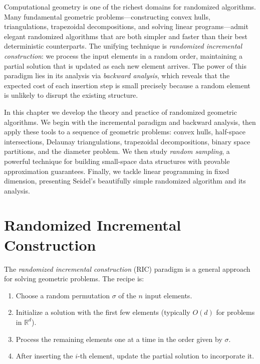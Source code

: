\documentclass[twoside,12pt]{book}
\theoremstyle{plain}
\theoremstyle{definition}
\theoremstyle{remark}
\begin{document}
Computational geometry is one of the richest domains for randomized algorithms. Many fundamental geometric problems---constructing convex hulls, triangulations, trapezoidal decompositions, and solving linear programs---admit elegant randomized algorithms that are both simpler and faster than their best deterministic counterparts. The unifying technique is \emph{randomized incremental construction}: we process the input elements in a random order, maintaining a partial solution that is updated as each new element arrives. The power of this paradigm lies in its analysis via \emph{backward analysis}, which reveals that the expected cost of each insertion step is small precisely because a random element is unlikely to disrupt the existing structure.

In this chapter we develop the theory and practice of randomized geometric algorithms. We begin with the incremental paradigm and backward analysis, then apply these tools to a sequence of geometric problems: convex hulls, half-space intersections, Delaunay triangulations, trapezoidal decompositions, binary space partitions, and the diameter problem. We then study \emph{random sampling}, a powerful technique for building small-space data structures with provable approximation guarantees. Finally, we tackle linear programming in fixed dimension, presenting Seidel's beautifully simple randomized algorithm and its analysis.

\section{Randomized Incremental Construction}
\label{sec:ric}

The \emph{randomized incremental construction} (RIC) paradigm is a general approach for solving geometric problems. The recipe is:

\begin{enumerate}[nosep]
    \item Choose a random permutation $\sigma$ of the $n$ input elements.
    \item Initialize a solution with the first few elements (typically $O(d)$ for problems in $\mathbb{R}^d$).
    \item Process the remaining elements one at a time in the order given by $\sigma$.
    \item After inserting the $i$-th element, update the partial solution to incorporate it.
\end{enumerate}
\end{document}

